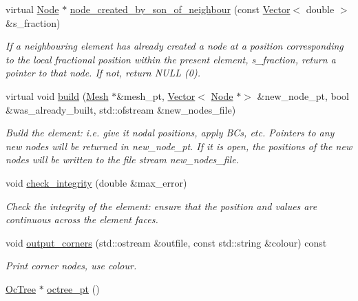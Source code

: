 \begin{DoxyCompactItemize}
virtual \hyperlink{classoomph_1_1Node}{Node} $\ast$ \hyperlink{classoomph_1_1RefineableQElement_3_013_01_4_aab54b116a277372d4af7d7c93301ecda}{node\+\_\+created\+\_\+by\+\_\+son\+\_\+of\+\_\+neighbour} (const \hyperlink{classoomph_1_1Vector}{Vector}$<$ double $>$ \&s\+\_\+fraction)
\begin{DoxyCompactList}\small\item\em If a neighbouring element has already created a node at a position corresponding to the local fractional position within the present element, s\+\_\+fraction, return a pointer to that node. If not, return N\+U\+LL (0). \end{DoxyCompactList}\item 
virtual void \hyperlink{classoomph_1_1RefineableQElement_3_013_01_4_a8e7f6c2a6aa695c1b6fcd4dbeba3fac6}{build} (\hyperlink{classoomph_1_1Mesh}{Mesh} $\ast$\&mesh\+\_\+pt, \hyperlink{classoomph_1_1Vector}{Vector}$<$ \hyperlink{classoomph_1_1Node}{Node} $\ast$$>$ \&new\+\_\+node\+\_\+pt, bool \&was\+\_\+already\+\_\+built, std\+::ofstream \&new\+\_\+nodes\+\_\+file)
\begin{DoxyCompactList}\small\item\em Build the element\+: i.\+e. give it nodal positions, apply B\+Cs, etc. Pointers to any new nodes will be returned in new\+\_\+node\+\_\+pt. If it is open, the positions of the new nodes will be written to the file stream new\+\_\+nodes\+\_\+file. \end{DoxyCompactList}\item 
void \hyperlink{classoomph_1_1RefineableQElement_3_013_01_4_ac956bd05c434861ba65b0431024c1072}{check\+\_\+integrity} (double \&max\+\_\+error)
\begin{DoxyCompactList}\small\item\em Check the integrity of the element\+: ensure that the position and values are continuous across the element faces. \end{DoxyCompactList}\item 
void \hyperlink{classoomph_1_1RefineableQElement_3_013_01_4_aa8ea5cf2c9fee8ff9a1c52505e736bbb}{output\+\_\+corners} (std\+::ostream \&outfile, const std\+::string \&colour) const
\begin{DoxyCompactList}\small\item\em Print corner nodes, use colour. \end{DoxyCompactList}\item 
\hyperlink{classoomph_1_1OcTree}{Oc\+Tree} $\ast$ \hyperlink{classoomph_1_1RefineableQElement_3_013_01_4_ae80b5899ce103e76f1ccea34d371c2ed}{octree\+\_\+pt} ()
$$
\end{DoxyCompactItemize}
